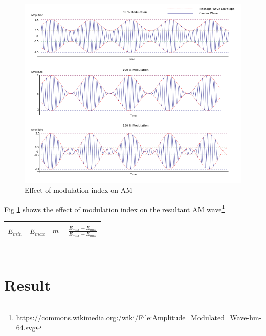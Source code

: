 \documentclass{book}
\begin{document}
\begin{figure}[h]

\includegraphics[width=\textwidth]{AMmodindex.png}
\caption{Effect of modulation index on AM}
\label{AMmodindex}
\end{figure}
\noindent Fig \ref{AMmodindex}  shows the effect of modulation index on the resultant AM wave\footnote{\url{https://commons.wikimedia.org:/wiki/File:Amplitude_Modulated_Wave-hm-64.svg}}
\begin{center}

\begin{tabular}{|l|l|l|}

\hline
 & &\\
 
$E_{min}$  & $E_{max}$ & $m=\frac{E_{max}-E_{min}}{E_{max}+E_{min}}$ \\
 & & \\ \hline
 & & \\ \hline
& & \\ \hline
& & \\ \hline
& & \\ \hline
& & \\ \hline

\end{tabular}
\end{center}


\section*{Result}
\end{document}
